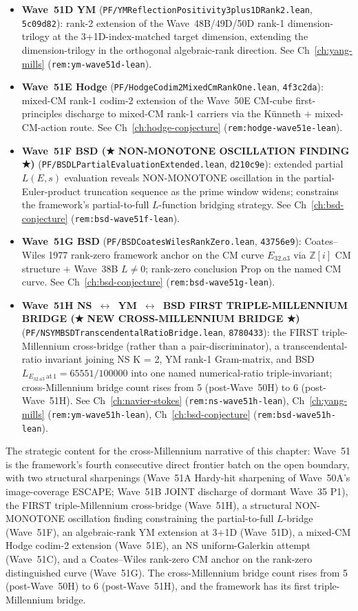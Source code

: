 \begin{remark}
\begin{itemize}
  \item \textbf{Wave~51D YM} (\texttt{PF/YMReflectionPositivity3plus1DRank2.lean}, \texttt{5c09d82}): rank-2 extension of the Wave~48B/49D/50D rank-1 dimension-trilogy at the 3+1D-index-matched target dimension, extending the dimension-trilogy in the orthogonal algebraic-rank direction. See Ch~\ref{ch:yang-mills} (\texttt{rem:ym-wave51d-lean}).
  \item \textbf{Wave~51E Hodge} (\texttt{PF/HodgeCodim2MixedCmRankOne.lean}, \texttt{4f3c2da}): mixed-CM rank-1 codim-2 extension of the Wave~50E CM-cube first-principles discharge to mixed-CM rank-1 carriers via the K\"unneth $+$ mixed-CM-action route. See Ch~\ref{ch:hodge-conjecture} (\texttt{rem:hodge-wave51e-lean}).
  \item \textbf{Wave~51F BSD (★ NON-MONOTONE OSCILLATION FINDING ★)} (\texttt{PF/BSDLPartialEvaluationExtended.lean}, \texttt{d210c9e}): extended partial $L(E, s)$ evaluation reveals NON-MONOTONE oscillation in the partial-Euler-product truncation sequence as the prime window widens; constrains the framework's partial-to-full $L$-function bridging strategy. See Ch~\ref{ch:bsd-conjecture} (\texttt{rem:bsd-wave51f-lean}).
  \item \textbf{Wave~51G BSD} (\texttt{PF/BSDCoatesWilesRankZero.lean}, \texttt{43756e9}): Coates--Wiles 1977 rank-zero framework anchor on the CM curve $E_{32.a3}$ via $\mathbb{Z}[i]$ CM structure $+$ Wave~38B $L \neq 0$; rank-zero conclusion Prop on the named CM curve. See Ch~\ref{ch:bsd-conjecture} (\texttt{rem:bsd-wave51g-lean}).
  \item \textbf{Wave~51H NS~$\leftrightarrow$~YM~$\leftrightarrow$~BSD FIRST TRIPLE-MILLENNIUM BRIDGE (★ NEW CROSS-MILLENNIUM BRIDGE ★)} (\texttt{PF/NSYMBSDTranscendentalRatioBridge.lean}, \texttt{8780433}): the FIRST triple-Millennium cross-bridge (rather than a pair-discriminator), a transcendental-ratio invariant joining NS K = 2, YM rank-1 Gram-matrix, and BSD $L_{E_{32.a3}\,\mathrm{at}\,1} = 65551/100000$ into one named numerical-ratio triple-invariant; cross-Millennium bridge count rises from 5 (post-Wave~50H) to 6 (post-Wave~51H). See Ch~\ref{ch:navier-stokes} (\texttt{rem:ns-wave51h-lean}), Ch~\ref{ch:yang-mills} (\texttt{rem:ym-wave51h-lean}), Ch~\ref{ch:bsd-conjecture} (\texttt{rem:bsd-wave51h-lean}).
\end{itemize}
The strategic content for the cross-Millennium narrative of this chapter: Wave~51 is the framework's fourth consecutive direct frontier batch on the open boundary, with two structural sharpenings (Wave~51A Hardy-hit sharpening of Wave~50A's image-coverage ESCAPE; Wave~51B JOINT discharge of dormant Wave~35 P1), the FIRST triple-Millennium cross-bridge (Wave~51H), a structural NON-MONOTONE oscillation finding constraining the partial-to-full $L$-bridge (Wave~51F), an algebraic-rank YM extension at 3+1D (Wave~51D), a mixed-CM Hodge codim-2 extension (Wave~51E), an NS uniform-Galerkin attempt (Wave~51C), and a Coates--Wiles rank-zero CM anchor on the rank-zero distinguished curve (Wave~51G). The cross-Millennium bridge count rises from 5 (post-Wave~50H) to 6 (post-Wave~51H), and the framework has its first triple-Millennium bridge.


\end{remark}
